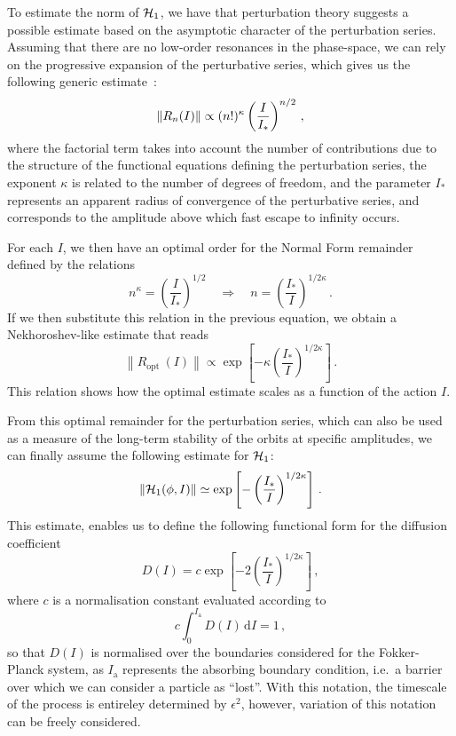 To estimate the norm of $\mathcal{H}_1$, we have that perturbation theory suggests a possible estimate based on the asymptotic character of the perturbation series. Assuming that there are no low-order resonances in the phase-space, we can rely on the progressive expansion of the perturbative series, which gives us the following generic estimate~\cite{Bazzani:1990aa}:
\begin{equation}
    \norm{R_n(I)} \propto (n!)^\kappa \left(\frac{I}{I_\ast}\right)^{n/2}\,,
\end{equation}
where the factorial term takes into account the number of contributions due to the structure of the functional equations defining the perturbation series, the exponent $\kappa$ is related to the number of degrees of freedom, and the parameter $I_\ast$ represents an apparent radius of convergence of the perturbative series, and corresponds to the amplitude above which fast escape to infinity occurs.

For each $I$, we then have an optimal order for the Normal Form remainder defined by the relations
\begin{equation}
    n^\kappa=\left(\frac{I}{I_\ast}\right)^{1 / 2} \quad \Rightarrow \quad n=\left(\frac{I_\ast}{I}\right)^{1 / 2 \kappa} \,.
\end{equation}
If we then substitute this relation in the previous equation, we obtain a Nekhoroshev-like estimate that reads
\begin{equation}
    \left\|R_{\text {opt }}(I)\right\| \propto \exp \left[-\kappa\left(\frac{I_*}{I}\right)^{1 / 2 \kappa}\right] \,.
\end{equation}
This relation shows how the optimal estimate scales as a function of the action $I$. 

From this optimal remainder for the perturbation series, which can also be used as a measure of the long-term stability of the orbits at specific amplitudes, we can finally assume the following estimate for $\mathcal{H}_1$:
\begin{equation}
    \left\|\mathcal{H}_1(\phi, I)\right\| \simeq \exp \left[-\left(\frac{I_\ast}{I}\right)^{1/2\kappa}\right] \,.
\end{equation}
This estimate, enables us to define the following functional form for the diffusion coefficient
\begin{equation}
    D(I) = c \exp\left[-2\left(\frac{I_\ast}{I}\right)^{1/2\kappa}\right]\,,
    \label{eq:diffusion}
\end{equation}
where $c$ is a normalisation constant evaluated according to
\begin{equation}
    c \int_0^{I_\text{a}} D(I)\,\mathrm{d}I = 1 \,,
\end{equation}
so that $D(I)$ is normalised over the boundaries considered for the Fokker-Planck system, as $I_\text{a}$ represents the absorbing boundary condition, i.e.\ a barrier over which we can consider a particle as ``lost''. With this notation, the timescale of the process is entireley determined by $\epsilon^2$, however, variation of this notation can be freely considered.

